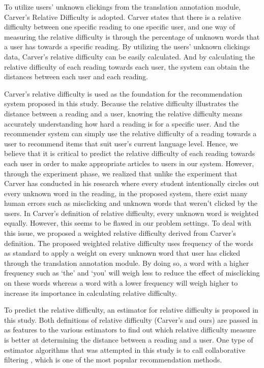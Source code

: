 To utilize users' unknown clickings from the translation annotation module, Carver's Relative Difficulty is adopted. Carver states that there is a relative difficulty between one specific reading to one specific user, and one way of measuring the relative difficulty is through the percentage of unknown words that a user has towards a specific reading. By utilizing the users' unknown clickings data, Carver's relative difficulty can be easily calculated. And by calculating the relative difficulty of each reading towards each user, the system can obtain the distances between each user and each reading.

Carver's relative difficulty is used as the foundation for the recommendation system proposed in this study. Because the relative difficulty illustrates the distance between a reading and a user, knowing the relative difficulty means accurately understanding how hard a reading is for a specific user. And the recommender system can simply use the relative difficulty of a reading towards a user to recommend items that suit user's current language level. Hence, we believe that it is critical to predict the relative difficulty of each reading towards each user in order to make appropriate articles to users in our system. However, through the experiment phase, we realized that unlike the experiment that Carver has conducted in his research where every student intentionally circles out every unknown word in the reading, in the proposed system, there exist many human errors such as misclicking and unknown words that weren't clicked by the users. In Carver's definition of relative difficulty, every unknown word is weighted equally. However, this seems to be flawed in our problem settings. To deal with this issue, we proposed a weighted relative difficulty derived from Carver's definition. The proposed weighted relative difficulty uses frequency of the words as standard to apply a weight on every unknown word that user has clicked through the translation annotation module. By doing so, a word with a higher frequency such as ‘the' and ‘you' will weigh less to reduce the effect of misclicking on these words whereas a word with a lower frequency will weigh higher to increase its importance in calculating relative difficulty. 

To predict the relative difficulty, an estimator for relative difficulty is proposed in this study. Both definitions of relative difficulty (Carver's and ours) are passed in as features to the various estimators to find out which relative difficulty measure is better at determining the distance between a reading and a user. One type of estimator algorithms that was attempted in this study is to call collaborative filtering \cite{Ricci2011}, which is one of the most popular recommendation methods. 

